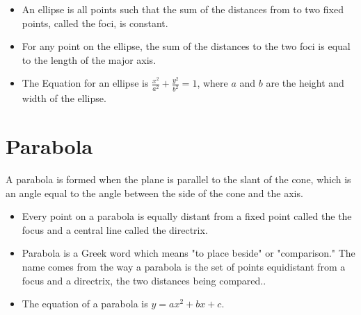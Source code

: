 \documentclass[12pt]{article}
\begin{document}
\begin{itemize}
\item An ellipse is all points such that the sum of the distances from to two fixed points, called the foci, is constant.
\item For any point on the ellipse, the sum of the distances to the two foci is equal to the length of the major axis.

\begin{center}
\end{center}

\item The Equation for an ellipse is $\frac{x^2}{a^2} + \frac{y^2}{b^2} = 1$,
where \( a \) and \( b \) are the height and width of the ellipse.
\end{itemize}

\newpage

\section*{Parabola}
A parabola is formed when the plane is parallel to the slant of the cone, which is an angle equal to the angle between the side of the cone and the axis.

\begin{itemize}
\item Every point on a parabola is equally distant from a fixed point called the the focus and a central line called the directrix.\\

\begin{center}
\end{center}

\item Parabola is a Greek word which means "to place beside" or "comparison." The name comes from the way a parabola is the set of points equidistant from a focus and a directrix, the two distances being compared..
\item The equation of a parabola is $y = ax^2 + bx + c$.
\end{itemize}
\end{document}
